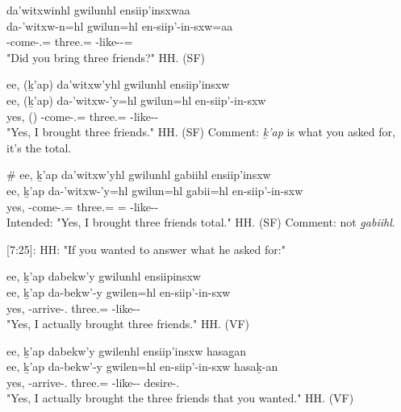 \begin{exe}
    \ex \begin{xlist}
        \item \glll da'witxwinhl gwilunhl ensiip'insxwaa\\
            da-'witxw-n=hl gwilun=hl en-siip'-in-sxw=aa\\
            \Com{}-come-\Ssg{}.\Ii{}=\Cn{} three.\Hum{}=\Cn{} \Nmlz{}-like--\Antip{}=\Q{} \\
            \glt "Did you bring three friends?" \hfill HH.\ElicitationDate{} (SF)
        \item \glll ee, (ḵ'ap) da'witxw'yhl gwilunhl ensiip'insxw \\
               ee, (ḵ'ap) da-'witxw-'y=hl gwilun=hl en-siip'-in-sxw \\
               yes, (\Verum{}) \Com{}-come-\Fsg{}.\Ii{}=\Cn{} three.\Hum{}=\Cn{} \Nmlz{}-like--\Antip{} \\
               \glt "Yes, I brought three friends." \hfill HH.\ElicitationDate{} (SF)
               Comment: \textit{ḵ'ap} is what you asked for, it's the total.
        \item \glll \# ee, ḵ'ap da'witxw'yhl gwilunhl g̱abiihl ensiip'insxw \\
               {} ee, ḵ'ap da-'witxw-'y=hl gwilun=hl g̱abii=hl en-siip'-in-sxw \\
               {} yes, \Verum{} \Com{}-come-\Fsg{}.\Ii{}=\Cn{} three.\Hum{}=\Cn{} \Cnt{}=\Cn{} \Nmlz{}-like--\Antip{} \\
               \glt Intended: "Yes, I brought three friends total." \hfill HH.\ElicitationDate{} (SF)
               Comment: not \textit{g̱abiihl}.
    \end{xlist}
\end{exe}

[7:25]: HH: "If you wanted to answer what he asked for:"

\begin{exe}
    \ex \begin{xlist}
            \item \glll
            ee, ḵ'ap dabekw'y gwilunhl ensiipinsxw\\
            ee, ḵ'ap da-bekw'-y gwilen=hl en-siip'-in-sxw\\
            yes, \Verum{} \Com{}-arrive-\Fsg{}.\Ii{} three.\Hum{}=\Cn{} \Nmlz{}-like--\Antip{} \\
            \glt "Yes, I actually brought three friends." \hfill HH.\ElicitationDate{} (VF)
            \item \glll
            ee, ḵ'ap dabekw'y gwilenhl ensiip'insxw hasag̱an \\
            ee, ḵ'ap da-bekw'-y gwilen=hl en-siip'-in-sxw hasaḵ-an\\
            yes, \Verum{} \Com{}-arrive-\Fsg{}.\Ii{} three.\Hum{}=\Cn{} \Nmlz{}-like--\Antip{} desire-\Ssg{}.\Ii{} \\
            \glt "Yes, I actually brought the three friends that you wanted." \hfill HH.\ElicitationDate{} (VF)
    \end{xlist}
\end{exe}

